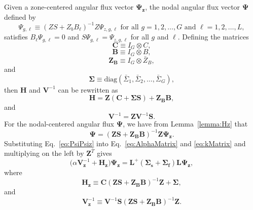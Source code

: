 Given a zone-centered angular flux vector $\mathbf{\Psi_{z}}$, the nodal angular flux vector $\mathbf{\Psi}$ defined by
\begin{equation}
	\Psi_{g,\ell} \equiv (ZS + Z_{b}B_{\ell})^{-1}Z \Psi_{z,g,\ell} \text{ for all } g = 1, 2, \dots, G \text{ and } \ell = 1, 2, \dots, L,
\end{equation}
satisfies $B_{\ell} \Psi_{g,\ell} = 0$ and $S \Psi_{g,\ell} = \Psi_{z,g,\ell}$ for all $g$ and $\ell$. Defining the matrices
\begin{equation}
	\mathbf{C} \equiv I_{G} \otimes C,
\end{equation}
\begin{equation}
	\mathbf{B} \equiv I_{G} \otimes B,
\end{equation}
\begin{equation}
	\mathbf{Z_{B}} \equiv I_{G} \otimes \bar{Z}_{B},
\end{equation}
and
\begin{equation}
	\mathbf{\Sigma} \equiv \text{diag}(\bar{\Sigma}_{1}, \bar{\Sigma}_{2}, \dots, \bar{\Sigma}_{G}),
\end{equation}
then $\mathbf{H}$ and $\mathbf{V}^{-1}$ can be rewritten as
\begin{equation}
	\mathbf{H} = \mathbf{Z}(\mathbf{C} + \mathbf{\Sigma S}) + \mathbf{Z_{B} B},
\end{equation}
and
\begin{equation}
	\mathbf{V}^{-1} = \mathbf{Z}\mathbf{V}^{-1} \mathbf{S}.
\end{equation}
For the nodal-centered angular flux $\mathbf{\Psi}$, we have from Lemma~\ref{lemma:Hz} that
\begin{equation}
	\mathbf{\Psi} = (\mathbf{ZS} + \mathbf{Z_{B}B})^{-1}\mathbf{Z}\mathbf{\Psi_{z}}.
	\label{eq:PsiPsiz}
\end{equation}
Substituting Eq.~\ref{eq:PsiPsiz} into Eq.~\ref{eq:AlphaMatrix} and \ref{eq:kMatrix} and multiplying on the left by $\mathbf{Z}^{T}$ gives
\begin{equation}
	\boxed{\big ( \alpha \mathbf{V}_\mathbf{z}^{-1} + \mathbf{H_{z}} \big ) \mathbf{\Psi_{z}} = \mathbf{L}^{+}( \mathbf{\Sigma_{s}} + \mathbf{\Sigma_{f}}) \mathbf{L} \mathbf{\Psi_{z}},}
	\label{eq:AlphaZ}
\end{equation}
where
\begin{equation}
	\mathbf{H_{z}} \equiv \mathbf{C}(\mathbf{ZS} + \mathbf{Z_{B}B})^{-1}\mathbf{Z} + \mathbf{\Sigma},
\end{equation}
and
\begin{equation}
	\mathbf{V}_{\mathbf{z}}^{-1} \equiv \mathbf{V}^{-1} \mathbf{S} (\mathbf{ZS} + \mathbf{Z_{B}B})^{-1}\mathbf{Z}.
\end{equation}


